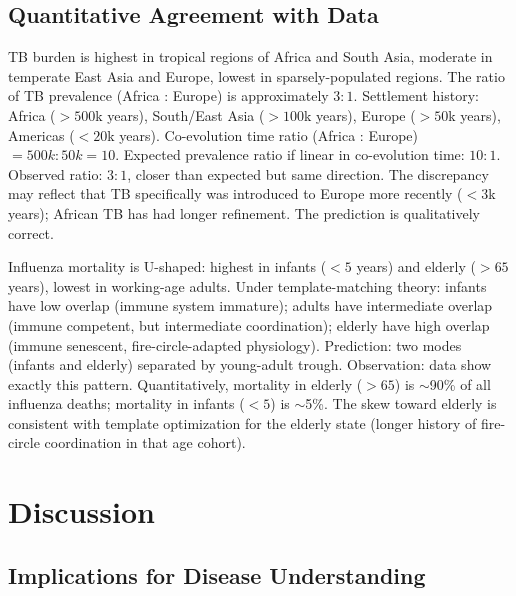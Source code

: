 \documentclass[11pt,twocolumn,a4paper]{article}
\begin{document}
\subsection{Quantitative Agreement with Data}

\begin{example}
TB burden is highest in tropical regions of Africa and South Asia, moderate in temperate East Asia and Europe, lowest in sparsely-populated regions. The ratio of TB prevalence (Africa : Europe) is approximately $3:1$. Settlement history: Africa ($>500$k years), South/East Asia ($>100$k years), Europe ($>50$k years), Americas ($<20$k years). Co-evolution time ratio (Africa : Europe) $= 500k : 50k = 10$. Expected prevalence ratio if linear in co-evolution time: $10:1$. Observed ratio: $3:1$, closer than expected but same direction. The discrepancy may reflect that TB specifically was introduced to Europe more recently ($<3$k years); African TB has had longer refinement. The prediction is qualitatively correct.
\end{example}

\begin{example}
Influenza mortality is U-shaped: highest in infants ($<5$ years) and elderly ($>65$ years), lowest in working-age adults. Under template-matching theory: infants have low overlap (immune system immature); adults have intermediate overlap (immune competent, but intermediate coordination); elderly have high overlap (immune senescent, fire-circle-adapted physiology). Prediction: two modes (infants and elderly) separated by young-adult trough. Observation: data show exactly this pattern. Quantitatively, mortality in elderly ($>65$) is $\sim$90\% of all influenza deaths; mortality in infants ($<5$) is $\sim$5\%. The skew toward elderly is consistent with template optimization for the elderly state (longer history of fire-circle coordination in that age cohort).
\end{example}

\section{Discussion}
\label{sec:discussion}

\subsection{Implications for Disease Understanding}
\end{document}
